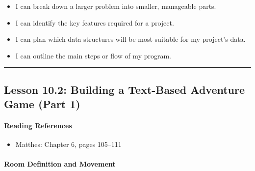 \documentclass[
  justified,
  openright,
]{tufte-book}
\let\subsubsection\paragraph
\let\paragraph\paragraph
\let\subsubsection\paragraph
\let\paragraph\paragraph
\providecommand{\tightlist}{%
  \setlength{\itemsep}{0pt}\setlength{\parskip}{0pt}}
\begin{document}
\begin{itemize}
\tightlist
\item[$\square$]
  I can break down a larger problem into smaller, manageable parts.
\item[$\square$]
  I can identify the key features required for a project.
\item[$\square$]
  I can plan which data structures will be most suitable for my
  project's data.
\item[$\square$]
  I can outline the main steps or flow of my program.
\end{itemize}

\begin{center}\rule{0.5\linewidth}{0.5pt}\end{center}

\subsection{Lesson 10.2: Building a Text-Based Adventure Game (Part
1)}\label{lesson-10.2-building-a-text-based-adventure-game-part-1}

\subsubsection{Reading References}\label{reading-references-29}

\begin{itemize}
\tightlist
\item
  Matthes: Chapter 6, pages 105--111
\end{itemize}

\subsubsection{Room Definition and
Movement}\label{room-definition-and-movement}
\end{document}
